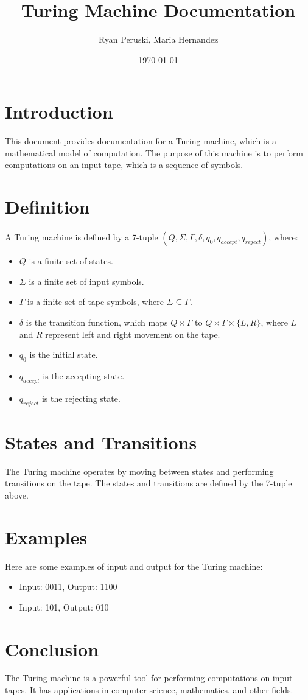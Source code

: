 \documentclass{article}
\title{Turing Machine Documentation}
\author{Ryan Peruski, Maria Hernandez}
\date{\today}
\begin{document}
\maketitle

\section{Introduction}
This document provides documentation for a Turing machine, which is a mathematical model of computation. The purpose of this machine is to perform computations on an input tape, which is a sequence of symbols.

\section{Definition}
A Turing machine is defined by a 7-tuple $(Q, \Sigma, \Gamma, \delta, q_0, q_{accept}, q_{reject})$, where:
\begin{itemize}
    \item $Q$ is a finite set of states.
    \item $\Sigma$ is a finite set of input symbols.
    \item $\Gamma$ is a finite set of tape symbols, where $\Sigma \subseteq \Gamma$.
    \item $\delta$ is the transition function, which maps $Q \times \Gamma$ to $Q \times \Gamma \times \{L, R\}$, where $L$ and $R$ represent left and right movement on the tape.
    \item $q_0$ is the initial state.
    \item $q_{accept}$ is the accepting state.
    \item $q_{reject}$ is the rejecting state.
\end{itemize}

\section{States and Transitions}
The Turing machine operates by moving between states and performing transitions on the tape. The states and transitions are defined by the 7-tuple above.

\section{Examples}
Here are some examples of input and output for the Turing machine:
\begin{itemize}
    \item Input: 0011, Output: 1100
    \item Input: 101, Output: 010
\end{itemize}

\section{Conclusion}
The Turing machine is a powerful tool for performing computations on input tapes. It has applications in computer science, mathematics, and other fields.
\end{document}
